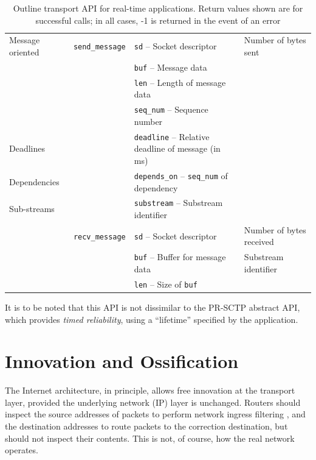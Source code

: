 \documentclass[10pt]{sig-alternate-05-2015}
\newcommand{\todo}[1]{\textbf{\textcolor{red}{To do -- #1}}}
\begin{document}
\begin{table}
\begin{tabularx}{\textwidth}{llll}
    \midrule
      Message oriented             & \texttt{send\_message}
                                              & \texttt{sd} -- Socket descriptor               & Number of bytes sent \\
                                   &          & \texttt{buf} -- Message data & \\
                                   &          & \texttt{len} -- Length of message data & \\
                                   &          & \texttt{seq\_num} -- Sequence number & \\
      Deadlines                    &          & \texttt{deadline} -- Relative deadline of message (in ms) & \\
      Dependencies                 &          & \texttt{depends\_on} -- \texttt{seq\_num} of dependency & \\
      Sub-streams                  &          & \texttt{substream} -- Substream identifier & \\
                                   & \texttt{recv\_message}
                                              & \texttt{sd} -- Socket descriptor               & Number of bytes received \\
                                   &          & \texttt{buf} -- Buffer for message data        & Substream identifier \\
                                   &          & \texttt{len} -- Size of \texttt{buf} & \\
    \bottomrule
  \end{tabularx}
  \caption{Outline transport API for real-time applications. Return values
  shown are for successful calls; in all cases, -1 is returned in the event
  of an error}
  \label{tab:api}
\end{table}

It is to be noted that this API is not dissimilar to the PR-SCTP abstract
API, which provides \textit{timed reliability}, using a ``lifetime''
specified by the application. 

\section{Innovation and Ossification}
\label{sec:ossification}

The Internet architecture, in principle, allows free innovation at the
transport layer, provided the underlying network (IP) layer is unchanged.
Routers should inspect the source addresses of packets to perform network
ingress filtering \cite{rfc:2827}, and the destination addresses to route
packets to the correction destination, but should not inspect their
contents. This is not, of course, how the real network operates.
\end{document}

